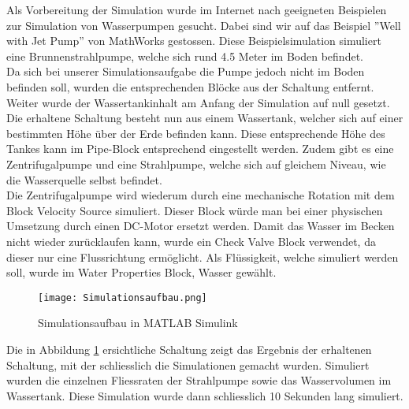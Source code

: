 Als Vorbereitung der Simulation wurde im Internet nach geeigneten Beispielen zur Simulation von Wasserpumpen gesucht. Dabei sind wir auf das Beispiel ''Well with Jet Pump'' \cite{MathWorks_JetPump} von MathWorks gestossen. Diese Beispielsimulation simuliert eine Brunnenstrahlpumpe, welche sich rund 4.5 Meter im Boden befindet.\\

Da sich bei unserer Simulationsaufgabe die Pumpe jedoch nicht im Boden befinden soll, wurden die entsprechenden Blöcke aus der Schaltung entfernt. Weiter wurde der Wassertankinhalt am Anfang der Simulation auf null gesetzt. Die erhaltene Schaltung besteht nun aus einem Wassertank, welcher sich auf einer bestimmten Höhe über der Erde befinden kann. Diese entsprechende Höhe des Tankes kann im Pipe-Block entsprechend eingestellt werden. Zudem gibt es eine Zentrifugalpumpe und eine Strahlpumpe, welche sich auf gleichem Niveau, wie die Wasserquelle selbst befindet.\\

Die Zentrifugalpumpe wird wiederum durch eine mechanische Rotation mit dem Block Velocity Source simuliert. Dieser Block würde man bei einer physischen Umsetzung durch einen DC-Motor ersetzt werden. Damit das Wasser im Becken nicht wieder zurücklaufen kann, wurde ein Check Valve Block verwendet, da dieser nur eine Flussrichtung ermöglicht. Als Flüssigkeit, welche simuliert werden soll, wurde im Water Properties Block, Wasser gewählt.\\

\begin{figure}[htb]
\texttt{[image: Simulationsaufbau.png]}
\caption{Simulationsaufbau in MATLAB Simulink}
\label{fig:Simulationsaufbau in MATLAB Simulink}
\end{figure}

Die in Abbildung \ref{fig:Simulationsaufbau in MATLAB Simulink} ersichtliche Schaltung zeigt das Ergebnis der erhaltenen Schaltung, mit der schliesslich die Simulationen gemacht wurden. Simuliert wurden die einzelnen Fliessraten der Strahlpumpe sowie das Wasservolumen im Wassertank. Diese Simulation wurde dann schliesslich 10 Sekunden lang simuliert.
